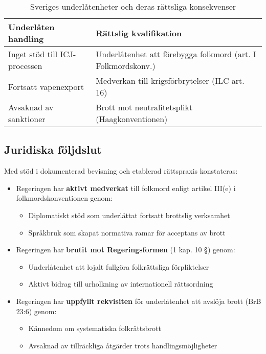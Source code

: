 \begin{table}[h]
\centering
\caption{Sveriges underlåtenheter och deras rättsliga konsekvenser}
\label{tab:underlatenhet}
\begin{tabular}{p{}p{}}
\textbf{Underlåten handling} & \textbf{Rättslig kvalifikation} \\ \midrule
Inget stöd till ICJ-processen & Underlåtenhet att förebygga folkmord (art. I Folkmordskonv.) \\
Fortsatt vapenexport & Medverkan till krigsförbrytelser (ILC art. 16) \\
Avsaknad av sanktioner & Brott mot neutralitetsplikt (Haagkonventionen) \\
\end{tabular}
\end{table}

\subsection*{Juridiska följdslut}
Med stöd i dokumenterad bevisning och etablerad rättspraxis konstateras:

\begin{itemize}
    \item Regeringen har \textbf{aktivt medverkat} till folkmord enligt artikel III(e) i folkmordskonventionen genom:
    \begin{itemize}
        \item Diplomatiskt stöd som underlättat fortsatt brottslig verksamhet
        \item Språkbruk som skapat normativa ramar för acceptans av brott
    \end{itemize}
    
    \item Regeringen har \textbf{brutit mot Regeringsformen} (1 kap. 10 §) genom:
    \begin{itemize}
        \item Underlåtenhet att lojalt fullgöra folkrättsliga förpliktelser
        \item Aktivt bidrag till urholkning av internationell rättsordning
    \end{itemize}
    
    \item Regeringen har \textbf{uppfyllt rekvisiten} för underlåtenhet att avslöja brott (BrB 23:6) genom:
    \begin{itemize}
        \item Kännedom om systematiska folkrättsbrott
        \item Avsaknad av tillräckliga åtgärder trots handlingsmöjligheter
    \end{itemize}
\end{itemize}

